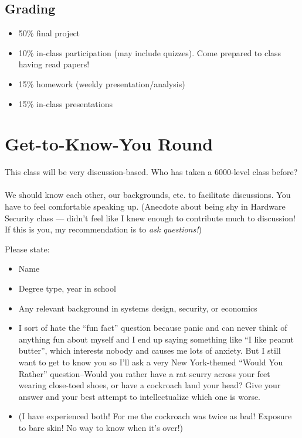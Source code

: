 \documentclass[11pt]{article}
\begin{document}
\subsection{Grading}

\begin{itemize}
    \item 50\% final project 
    \item 10\% in-class participation (may include quizzes). Come prepared to class having read papers! 
    \item 15\% homework (weekly presentation/analysis)
    \item 15\% in-class presentations
\end{itemize}


\section{Get-to-Know-You Round}

This class will be very discussion-based. Who has taken a 6000-level class before?
\\ \\ 
We should know each other, our backgrounds, etc. to facilitate discussions. You have to feel comfortable speaking up. (Anecdote about being shy in Hardware Security class --- didn't feel like I knew enough to contribute much to discussion! If this is you, my recommendation is to {\it ask questions!})

Please state:

\begin{itemize}
    \item Name
    \item Degree type, year in school
    \item Any relevant background in systems design, security, or economics
    \item I sort of hate the ``fun fact'' question because panic and can never think of anything fun about myself and I end up saying something like ``I like peanut butter'', which interests nobody and causes me lots of anxiety. 
    But I still want to get to know you so I'll ask a very New York-themed ``Would You Rather'' question--Would you rather have a rat scurry across your feet wearing close-toed shoes, or have a cockroach land your head? Give your answer and your best attempt to intellectualize which one is worse. 
    \item (I have experienced both! For me the cockroach was twice as bad! Exposure to bare skin! No way to know when it's over!)
\end{itemize}
\end{document}
